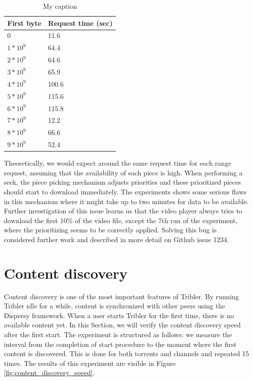 \begin{table}[]
	\centering
	\label{table:video_player_seek_times}
	\begin{tabular}{|l|l|}
		\hline
		First byte               & Request time (sec) \\ \hline
		0                        & 11.6                  \\ \hline
		$ 1 * 10^9 $ & 64.4                  \\ \hline
		$ 2 * 10^9 $ & 64.6                  \\ \hline
		$ 3 * 10^9 $ & 65.9                   \\ \hline
		$ 4 * 10^9 $ & 100.6                   \\ \hline
		$ 5 * 10^9 $ & 115.6                   \\ \hline
		$ 6 * 10^9 $ & 115.8                  \\ \hline
		$ 7 * 10^9 $ & 12.2                  \\ \hline
		$ 8 * 10^9 $ & 66.6                   \\ \hline
		$ 9 * 10^9 $ & 52.4                   \\ \hline
	\end{tabular}
	\caption{My caption}
\end{table}

Theoretically, we would expect around the same request time for each range request, assuming that the availability of each piece is high. When performing a seek, the piece picking mechanism adjusts priorities and these prioritized pieces should start to download immediately. The experiments shows some serious flaws in this mechanism where it might take up to two minutes for data to be available. Further investigation of this issue learns us that the video player always tries to download the first 10\% of the video file, except the 7th run of the experiment, where the prioritizing seems to be correctly applied. Solving this bug is considered further work and described in more detail on Github issue 1234.

\section{Content discovery}
Content discovery is one of the most important features of Tribler. By running Tribler idle for a while, content is synchronized with other peers using the Dispersy framework. When a user starts Tribler for the first time, there is no available content yet. In this Section, we will verify the content discovery speed after the first start. The experiment is structured as follows: we measure the interval from the completion of start procedure to the moment where the first content is discovered. This is done for both torrents and channels and repeated 15 times. The results of this experiment are visible in Figure \ref{fig:content_discovery_speed}.

